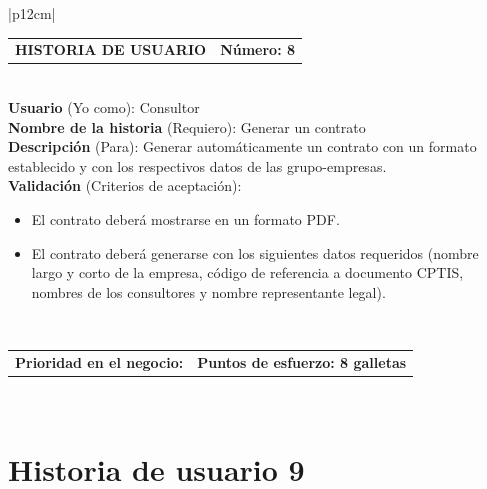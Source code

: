 \documentclass[11pt,letterpaper]{report}
\begin{document}
	\begin{center}	
		\begin{tabular}{|p{12cm}|}
			\hline
			\begin{tabular}{c|c}
				\textbf{HISTORIA DE USUARIO} & \textbf{Número: 8} \\
			\end{tabular} \\ \hline
			\textbf{Usuario} (Yo como): Consultor \\ \hline
			\textbf{Nombre de la historia} (Requiero): Generar un contrato \\ \hline
			\textbf{Descripción} (Para): Generar automáticamente un contrato con un formato establecido y con los respectivos datos de las grupo-empresas.\\ \hline
			\textbf{Validación} (Criterios de aceptación): \\
			\begin{minipage}{12cm}
				\begin{itemize}
					\item El contrato deberá mostrarse en un formato PDF.
					\item El contrato deberá generarse con los siguientes datos requeridos (nombre largo y corto de la empresa, código de referencia a documento CPTIS, nombres de los consultores y nombre representante legal).
				\end{itemize}
			\end{minipage} \\ \hline
			\begin{tabular}{p{6cm}|c}
				\textbf{Prioridad en el negocio: } & \textbf{Puntos de esfuerzo: 8 galletas} \\
			\end{tabular} \\ \hline
		\end{tabular}
	\end{center}
	
	\section{Historia de usuario 9}
	
\end{document}
